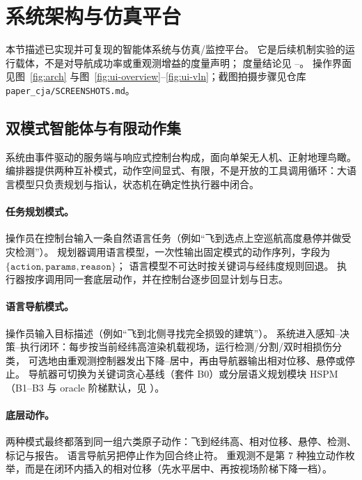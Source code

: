 \section{系统架构与仿真平台}
\label{sec:architecture}

本节描述已实现并可复现的智能体系统与仿真/监控平台。
它是后续机制实验的运行载体，不是对导航成功率或重观测增益的度量声明；
度量结论见 --。
操作界面见图~\ref{fig:arch} 与图~\ref{fig:ui-overview}--\ref{fig:ui-vln}；截图拍摄步骤见仓库 \texttt{paper\_cja/SCREENSHOTS.md}。

\subsection{双模式智能体与有限动作集}
\label{sec:dualmode}
系统由事件驱动的服务端与响应式控制台构成，面向单架无人机、正射地理鸟瞰。
编排器提供两种互补模式，动作空间显式、有限，不是开放的工具调用循环：大语言模型只负责规划与指认，状态机在确定性执行器中闭合。

\paragraph{任务规划模式。}
操作员在控制台输入一条自然语言任务（例如``飞到选点上空巡航高度悬停并做受灾检测''）。
规划器调用语言模型，一次性输出固定模式的动作序列，字段为 $\{\texttt{action},\texttt{params},\texttt{reason}\}$；
语言模型不可达时按关键词与经纬度规则回退。
执行器按序调用同一套底层动作，并在控制台逐步回显计划与日志。

\paragraph{语言导航模式。}
操作员输入目标描述（例如``飞到北侧寻找完全损毁的建筑''）。
系统进入感知--决策--执行闭环：每步按当前经纬高渲染机载视场，运行检测/分割/双时相损伤分类，
可选地由重观测控制器发出下降--居中，再由导航器输出相对位移、悬停或停止。
导航器可切换为关键词贪心基线（套件 B0）或分层语义规划模块 HSPM（B1--B3 与 oracle 阶梯默认，见 ）。

\paragraph{底层动作。}
两种模式最终都落到同一组六类原子动作：飞到经纬高、相对位移、悬停、检测、标记与报告。
语言导航另把停止作为回合终止符。
重观测不是第 7 种独立动作枚举，而是在闭环内插入的相对位移（先水平居中、再按视场阶梯下降一档）。

